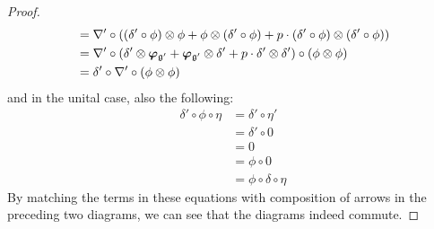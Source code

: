 \begin{proof}
$$\begin{aligned}
                                        & = \nabla' \circ \left((\delta' \circ \phi) \tensor \phi + \phi \tensor (\delta' \circ \phi) + p \cdot (\delta' \circ \phi) \tensor (\delta' \circ \phi)\right)
                                        \\
                                        & = \nabla' \circ \left(\delta' \tensor \Frob_{\g'} + \Frob_{\g'} \tensor \delta' + p \cdot \delta' \tensor \delta'\right) \circ (\phi \tensor \phi)
                                        \\
                                        & = \delta' \circ \nabla' \circ (\phi \tensor \phi)
                                    \end{aligned}
                                $$
                            and in the unital case, also the following:
                                $$
                                    \begin{aligned}
                                        \delta' \circ \phi \circ \eta & = \delta' \circ \eta'
                                        \\
                                        & = \delta' \circ 0
                                        \\
                                        & = 0
                                        \\
                                        & = \phi \circ 0
                                        \\
                                        & = \phi \circ \delta \circ \eta
                                    \end{aligned}
                                $$
                            By matching the terms in these equations with composition of arrows in the preceding two diagrams, we can see that the diagrams indeed commute.
                        \end{proof}
                
